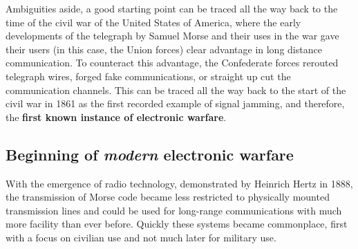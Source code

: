 \documentclass[palatino,english,purist]{ist-report}
\begin{document}
Ambiguities aside, a good starting point can be traced all the way back to the time of the civil war of the United States of America, where the early developments of the telegraph by Samuel Morse and their uses in the war gave their users (in this case, the Union forces) clear advantage in long distance communication\footnotemark. To counteract this advantage, the Confederate forces rerouted telegraph wires, forged fake communications, or straight up cut the communication channels. This can be traced all the way back to the start of the civil war in 1861 as the first recorded example of signal jamming, and therefore, the \textbf{first known instance of electronic warfare}.

\subsection{Beginning of \textit{modern} electronic warfare}

With the emergence of radio technology, demonstrated by Heinrich Hertz in 1888, the transmission of Morse code became less restricted to physically mounted transmission lines and could be used for long-range communications with much more facility than ever before. Quickly these systems became commonplace, first with a focus on civilian use and not much later for military use.
\end{document}
